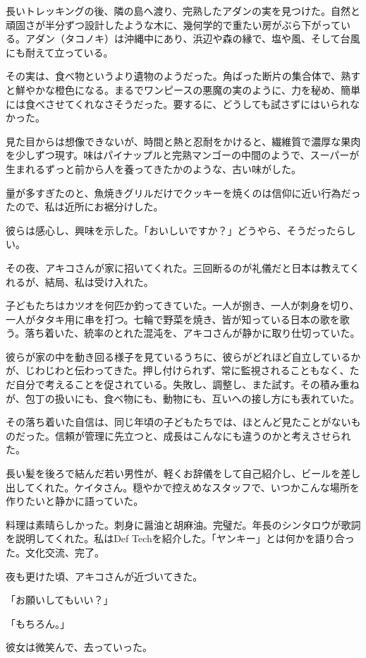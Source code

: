 \documentclass[
  letterpaper,
  oneside]{scrbook}
\begin{document}
長いトレッキングの後、隣の島へ渡り、完熟したアダンの実を見つけた。自然と頑固さが半分ずつ設計したような木に、幾何学的で重たい房がぶら下がっている。アダン（タコノキ）は沖縄中にあり、浜辺や森の縁で、塩や風、そして台風にも耐えて立っている。

その実は、食べ物というより遺物のようだった。角ばった断片の集合体で、熟すと鮮やかな橙色になる。まるでワンピースの悪魔の実のように、力を秘め、簡単には食べさせてくれなさそうだった。要するに、どうしても試さずにはいられなかった。

見た目からは想像できないが、時間と熱と忍耐をかけると、繊維質で濃厚な果肉を少しずつ現す。味はパイナップルと完熟マンゴーの中間のようで、スーパーが生まれるずっと前から人を養ってきたかのような、古い味がした。

量が多すぎたのと、魚焼きグリルだけでクッキーを焼くのは信仰に近い行為だったので、私は近所にお裾分けした。

彼らは感心し、興味を示した。「おいしいですか？」どうやら、そうだったらしい。

その夜、アキコさんが家に招いてくれた。三回断るのが礼儀だと日本は教えてくれるが、結局、私は受け入れた。

子どもたちはカツオを何匹か釣ってきていた。一人が捌き、一人が刺身を切り、一人がタタキ用に串を打つ。七輪で野菜を焼き、皆が知っている日本の歌を歌う。落ち着いた、統率のとれた混沌を、アキコさんが静かに取り仕切っていた。

彼らが家の中を動き回る様子を見ているうちに、彼らがどれほど自立しているかが、じわじわと伝わってきた。押し付けられず、常に監視されることもなく、ただ自分で考えることを促されている。失敗し、調整し、また試す。その積み重ねが、包丁の扱いにも、食べ物にも、動物にも、互いへの接し方にも表れていた。

その落ち着いた自信は、同じ年頃の子どもたちでは、ほとんど見たことがないものだった。信頼が管理に先立つと、成長はこんなにも違うのかと考えさせられた。

長い髪を後ろで結んだ若い男性が、軽くお辞儀をして自己紹介し、ビールを差し出してくれた。ケイタさん。穏やかで控えめなスタッフで、いつかこんな場所を作りたいと静かに語っていた。

料理は素晴らしかった。刺身に醤油と胡麻油。完璧だ。年長のシンタロウが歌詞を説明してくれた。私はDef
Techを紹介した。「ヤンキー」とは何かを語り合った。文化交流、完了。

夜も更けた頃、アキコさんが近づいてきた。

「お願いしてもいい？」

「もちろん。」

彼女は微笑んで、去っていった。
\end{document}
